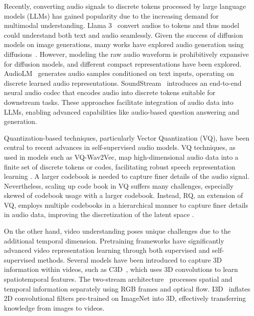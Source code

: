 Recently, converting audio signals to discrete tokens processed by large language models (LLMs) has gained popularity due to the increasing demand for multimodal understanding. Llama 3~\cite{dubey2024llama} convert audios to tokens and thus model could understand both text and audio seamlessly. Given the success of diffusion models on image generations, many works have explored audio generation using diffusions~\cite{kreuk2023audiogen}. However, modeling the raw audio waveform is prohibitively expansive for diffusion models, and different compact representations have been explored. AudioLM~\cite{borsos2023audiolm} generates audio samples conditioned on text inputs, operating on discrete learned audio representations. SoundStream~\cite{zeghidour2021soundstream} introduces an end-to-end neural audio codec that encodes audio into discrete tokens suitable for downstream tasks. These approaches facilitate integration of audio data into LLMs, enabling advanced capabilities like audio-based question answering and generation.

Quantization-based techniques, particularly Vector Quantization (VQ), have been central to recent advances in self-supervised audio models. VQ techniques, as used in models such as VQ-Wav2Vec, map high-dimensional audio data into a finite set of discrete tokens or codes, facilitating robust speech representation learning \cite{baevski2020vqwav2vec}. A larger codebook is needed to capture finer details of the audio signal. Nevertheless, scaling up code book in VQ suffers many challenges, especially skewed of codebook usage with a larger codebook. Instead, RQ, an extension of VQ, employs multiple codebooks in a hierarchical manner to capture finer details in audio data, improving the discretization of the latent space \cite{dhariwal2020jukebox}.

On the other hand, video understanding poses unique challenges due to the additional temporal dimension. Pretraining frameworks have significantly advanced video representation learning through both supervised and self-supervised methods.
Several models have been introduced to capture 3D information within videos, such as C3D~\cite{tran2015learning}, which uses 3D convolutions to learn spatiotemporal features. The two-stream architecture~\cite{simonyan2014two} processes spatial and temporal information separately using RGB frames and optical flow. I3D~\cite{carreira2017quo} inflates 2D convolutional filters pre-trained on ImageNet into 3D, effectively transferring knowledge from images to videos.

